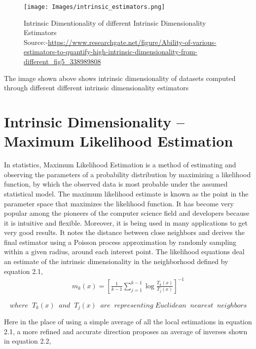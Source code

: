 \documentclass[12pt,letterpaper]{report}
\begin{document}
\begin{figure}[h]
    \centering
    \texttt{[image: Images/intrinsic\_estimators.png]}
    \caption{Intrinsic Dimentionality of different Intrinsic Dimensionality Estimators\\ Source:-\href{https://www.researchgate.net/figure/Ability-of-various-estimators-to-quantify-high-intrinsic-dimensionality-from-different_fig5_338989808}{https://www.researchgate.net/figure/Ability-of-various-estimators-to-quantify-high-intrinsic-dimensionality-from-different_fig5_338989808}}
    \label{fig:Intrinsic Dimentionality of different Intrinsic Dimensionality Estimators}
\end{figure}

The image shown above shows intrinsic dimensionality of datasets computed through different different intrinsic dimensionality estimators

\section{Intrinsic Dimensionality – Maximum Likelihood Estimation}
In statistics, Maximum Likelihood Estimation is a method of estimating and observing the parameters of a probability distribution by maximizing a likelihood function, by which the observed data is most probable under the assumed statistical model. The maximum likelihood estimate is known as the point in the parameter space that maximizes the likelihood function\cite{3,4}. It has become very popular among the pioneers of the computer science field and developers because it is intuitive and flexible. Moreover, it is being used in many applications to get very good results. It notes the distance between close neighbors and derives the final estimator using a Poisson process approximation by randomly sampling within a given radius, around each interest point. The likelihood equations deal an estimate of the intrinsic dimensionality in the neighborhood defined by equation 2.1, \\
\begin{align}
    \label{eq:example}
    m_k(x) = [\frac{1}{k-1} \sum_{j=1}^{k-1} \log \frac{T_k(x)}{T_j(x)} ]^{-1}
\end{align}


    \[where\;\; T_k(x)\;\; and\;\; T_j(x) \;\; are\;\; representing\; Euclidean\;\; nearest\;\; neighbors \]   

Here in the place of using a simple average of all the local estimations in equation 2.1, a more refined and accurate direction proposes an average of inverses shown in equation 2.2,
\end{document}
